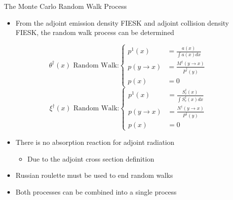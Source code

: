 \documentclass{beamer}
\begin{document}
\begin{frame}{The Monte Carlo Random Walk Process}
  \begin{itemize}
    \item From the adjoint emission density FIESK and adjoint collision 
      density FIESK, the random walk process can be determined
  \end{itemize}
  \begin{equation*}
    \theta^{\dagger}(x)\text{ Random Walk:}
    \begin{cases}
      p^1(x) & = \frac{a(x)}{\int a(x)dx} \\
      p(y \to x) & = \frac{M^{\dagger}(y \to x)}{\overline{P}^{\dagger}(y)} \\
      p(x) & = 0
    \end{cases}
  \end{equation*}
  \medskip
  \begin{equation*}
    \xi^{\dagger}(x)\text{ Random Walk:}
    \begin{cases}
      p^1(x) & = \frac{S_c^{\dagger}(x)}{\int S_c^{\dagger}(x)dx} \\
      p(y \to x) & = \frac{N^{\dagger}(y \to x)}{P^{\dagger}(y)} \\
      p(x) & = 0
    \end{cases}
  \end{equation*}

  \begin{itemize}
    \item There is no absorption reaction for adjoint radiation
      \smallskip
      \begin{itemize}
        \item Due to the adjoint cross section definition
      \end{itemize}
      \medskip
    \item Russian roulette must be used to end random walks
      \medskip
    \item Both processes can be combined into a single process
  \end{itemize}

\end{frame}
\end{document}
